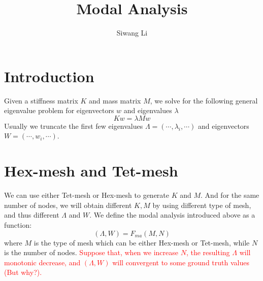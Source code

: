 \documentclass[9pt,twocolumn]{extarticle}
\author{Siwang Li}
\title{Modal Analysis}
\newcommand{\TODO}[1]{\textcolor{red}{#1}}
\begin{document}
\maketitle

\setlength{\parskip}{0.5ex}

\section{Introduction}
Given a stiffness matrix $K$ and mass matrix $M$, we solve for the following general eigenvalue problem for eigenvectors $w$ and eigenvalues $\lambda$
\begin{equation} \label{ma}
  Kw = \lambda Mw
\end{equation}
Usually we truncate the first few eigenvalues $\Lambda = (\cdots, \lambda_i, \cdots)$ and eigenvectors $W = (\cdots, w_i, \cdots)$.

\section{Hex-mesh and Tet-mesh}
We can use either Tet-mesh or Hex-mesh to generate $K$ and $M$. And for the same number of nodes, we will obtain different $K, M$ by using different type of mesh, and thus different $\Lambda$ and $W$. We define the modal analysis introduced above as a function: 
\begin{equation} \label{ma-f}
  (\Lambda,W) = F_{ma}(M,N)
\end{equation}
where $M$ is the type of mesh which can be either Hex-mesh or Tet-mesh, while $N$ is the number of nodes. \TODO{Suppose that, when we increase $N$, the resulting $\Lambda$ will monotonic decrease, and $(\Lambda,W)$ will convergent to some ground truth values (But why?).} 
\end{document}
